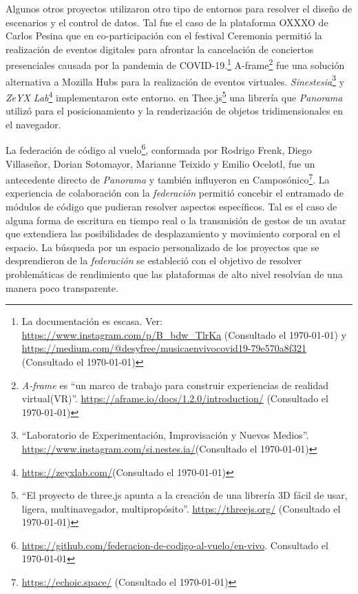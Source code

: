 Algunos otros proyectos utilizaron otro tipo de entornos para resolver el diseño de escenarios y el control de datos. Tal fue el caso de la plataforma OXXXO de Carlos Pesina que en co-participación con el festival Ceremonia permitió la realización de eventos digitales para afrontar la cancelación de conciertos presenciales causada por la pandemia de COVID-19.\footnote{La documentación es escasa. Ver: \url{https://www.instagram.com/p/B_bdw_TlrKa} (Consultado el \today) y \url{https://medium.com/@desyfree/musicaenvivocovid19-79e570a8f321} (Consultado el \today)} A-frame\footnote{\textit{A-frame} es ``un marco de trabajo para construir experiencias de realidad virtual(VR)''. \url{https://aframe.io/docs/1.2.0/introduction/} (Consultado el \today)} fue una solución alternativa a Mozilla Hubs para la realización de eventos virtuales. \textit{Sinestesia}\footnote{``Laboratorio de Experimentación, Improvisación y Nuevos Medios''. \url{https://www.instagram.com/si.nestes.ia/}(Consultado el \today)} y \textit{ZeYX Lab}\footnote{\url{https://zeyxlab.com/}(Consultado el \today)} implementaron este entorno.  en Thee.js\footnote{``El proyecto de three.js apunta a la creación de una librería 3D fácil de usar, ligera, multinavegador, multipropósito''. \url{https://threejs.org/} (Consultado el \today)} una librería que \emph{Panorama} utilizó para el posicionamiento y la renderización de objetos tridimensionales en el navegador.


La federación de código al vuelo\footnote{\url{https://github.com/federacion-de-codigo-al-vuelo/en-vivo}. Consultado el \today}, conformada por Rodrigo Frenk, Diego Villaseñor, Dorian Sotomayor, Marianne Teixido y Emilio Ocelotl, fue un antecedente directo de \emph{Panorama}  y también influyeron en Camposónico\footnote{\url{https://echoic.space/} (Consultado el \today)}. La experiencia de colaboración con la \textit{federación} permitió concebir el entramado de módulos de código que pudieran resolver aspectos específicos. Tal es el caso de alguna forma de escritura en tiempo real o la transmisión de gestos de un avatar que extendiera las posibilidades de desplazamiento y movimiento corporal en el espacio. La búsqueda por un espacio personalizado de los proyectos que se desprendieron de la \textit{federación} se estableció con el objetivo de resolver problemáticas de rendimiento que las plataformas de alto nivel resolvían de una manera poco transparente. 

